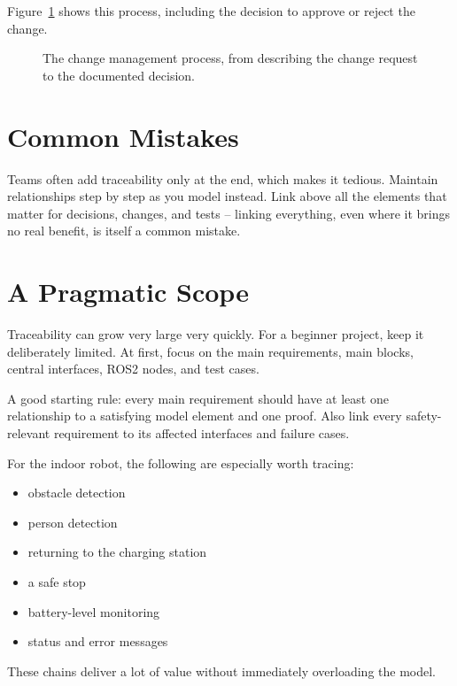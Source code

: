 Figure~\ref{fig:kap20-aenderungsmanagement-ablauf} shows this process, including the decision to approve or reject the change.

\begin{figure}[H]
  \centering
  \caption{The change management process, from describing the change request to the documented decision.}
  \label{fig:kap20-aenderungsmanagement-ablauf}
\end{figure}

\section{Common Mistakes}
Teams often add traceability only at the end, which makes it tedious. Maintain relationships step by step as you model instead. Link above all the elements that matter for decisions, changes, and tests -- linking everything, even where it brings no real benefit, is itself a common mistake.

\section{A Pragmatic Scope}
Traceability can grow very large very quickly. For a beginner project, keep it deliberately limited. At first, focus on the main requirements, main blocks, central interfaces, ROS2 nodes, and test cases.

A good starting rule: every main requirement should have at least one relationship to a satisfying model element and one proof. Also link every safety-relevant requirement to its affected interfaces and failure cases.

For the indoor robot, the following are especially worth tracing:

\begin{itemize}
    \item obstacle detection
    \item person detection
    \item returning to the charging station
    \item a safe stop
    \item battery-level monitoring
    \item status and error messages
\end{itemize}

These chains deliver a lot of value without immediately overloading the model.

